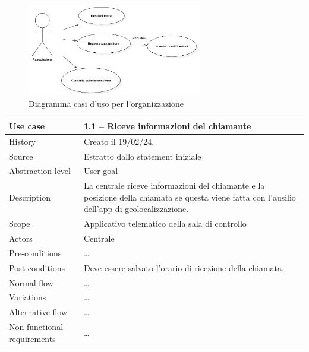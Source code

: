 \documentclass{article}
\begin{document}
    \begin{figure}
        \centering
        \includegraphics[width=3in]{diagrams/png/uc-associazione.png}
        \caption{Diagramma casi d'uso per l'organizzazione}
        \label{fig:uc-organization}
    \end{figure}


    \def\graycolor{gray!15}
    \def\creationDate{Creato il 19/02/24.\space}

    \begin{table}
        \rowcolors{2}{\graycolor}{white}
        \begin{tabularx}{\textwidth}{l|X}
            Use case & \textbf{1.1 – Riceve informazioni del chiamante} \\
            \hline
            History & \creationDate \\
            Source & Estratto dallo statement iniziale \\
            Abstraction level & User-goal \\
            Description & La centrale riceve informazioni del chiamante e la posizione della chiamata se questa viene fatta con l’ausilio dell’app di geolocalizzazione. \\
            Scope & Applicativo telematico della sala di controllo \\
            Actors & Centrale \\
            Pre-conditions & \dots \\
            Post-conditions & Deve essere salvato l’orario di ricezione della chiamata. \\
            Normal flow & \dots \\
            Variations & \dots \\
            Alternative flow & \dots \\
            Non-functional requirements & \dots
        \end{tabularx}
        \label{tab:usecase1.1}
    \end{table}
\end{document}
